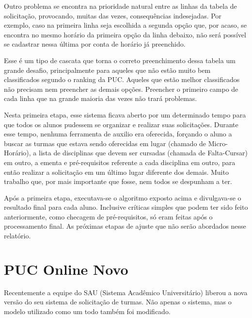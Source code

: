 \documentclass[graduacao,brazil]{ThesisPUC}
\begin{document}
Outro problema se encontra na prioridade natural entre as linhas da tabela de solicitação, provocando, muitas das vezes, consequências indesejadas. Por exemplo, caso na primeira linha seja escolhida a segunda opção que, por acaso, se encontra no mesmo horário da primeira opção da linha debaixo, não será possível se cadastrar nessa última por conta de horário já preenchido.

Esse é um tipo de cascata que torna o correto preenchimento dessa tabela um grande desafio, principalmente para aqueles que não estão muito bem classificados segundo o ranking da PUC. Aqueles que estão melhor classificados não precisam nem preencher as demais opções. Preencher o primeiro campo de cada linha que na grande maioria das vezes não trará problemas.

Nesta primeira etapa, esse sistema ficava aberto por um determinado tempo para que todos os alunos pudessem se organizar e realizar suas solicitações. Durante esse tempo, nenhuma ferramenta de auxilio era oferecida, forçando o aluno a buscar as turmas que estava sendo oferecidas em lugar (chamado de Micro-Horário), a lista de disciplinas que devem ser cursadas (chamada de Falta-Cursar) em outro, a ementa e pré-requisitos referente a cada disciplina em outro, para então realizar a solicitação em um último lugar diferente dos demais. Muito trabalho que, por mais importante que fosse, nem todos se despunham a ter.

Após a primeira etapa, executava-se o algoritmo exposto acima e divulgava-se o resultado final para cada aluno. Inclusive críticas simples que podem ter sido feito anteriormente, como checagem de pré-requisitos, só eram feitas após o processamento final. As próximas etapas de ajuste que não serão abordados nesse relatório.


\section{PUC Online Novo}

Recentemente a equipe do SAU (Sistema Acadêmico Universitário) liberou a nova versão do seu sistema de solicitação de turmas. Não apenas o sistema, mas o modelo utilizado como um todo também foi modificado.
\end{document}
